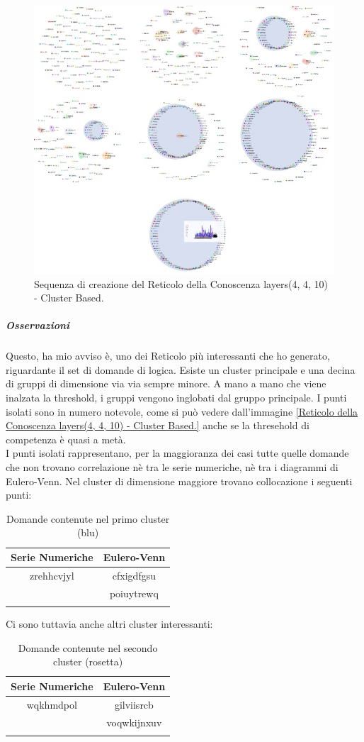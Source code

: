 \begin{figure}[H]
\centering
	\includegraphics[width=0.70\linewidth]{./image/collage_reticolo-logica(4,4,10).png}
	\caption{Sequenza di creazione del Reticolo della Conoscenza layers(4, 4, 10) - Cluster Based.}
	\label{Sequenza di creazione del Reticolo della Conoscenza layers(4, 4, 10) - Cluster Based.}
\end{figure}
\noindent

\subparagraph{Osservazioni}\mbox{}
\noindent
Questo, ha mio avviso \`e, uno dei Reticolo pi\`u interessanti che ho generato, riguardante il set di domande di logica.
Esiste un cluster principale e una decina di gruppi di dimensione via via sempre minore. A mano a mano che viene inalzata la threshold, i gruppi vengono inglobati dal gruppo principale. I punti isolati sono in numero notevole, come si pu\`o vedere dall'immagine \ref{Reticolo della Conoscenza layers(4, 4, 10) - Cluster Based.} anche se la thresehold di competenza \`e quasi a met\`a.\\
I punti isolati rappresentano, per la maggioranza dei casi tutte quelle domande che non trovano correlazione n\`e tra le serie numeriche, n\`e tra i diagrammi di Eulero-Venn. Nel cluster di dimensione maggiore trovano collocazione i seguenti punti:
\begin{longtable}{|c|c|}
	\hline
	\textbf{Serie Numeriche} & \textbf{Eulero-Venn} \\\hline\hline
	zrehhcvjyl & cfxigdfgsu \\
	           & poiuytrewq \\
	
\hline
\caption{Domande contenute nel primo cluster (blu)}\label{tab:Domande contenute nel primo cluster}
\end{longtable}
\noindent
Ci sono tuttavia anche altri cluster interessanti:
\begin{longtable}{|c|c|}
	\hline
	\textbf{Serie Numeriche} & \textbf{Eulero-Venn} \\\hline\hline
	wqkhmdpol & gilviisrcb \\
	           & voqwkijnxuv\\
	
\hline
\caption{Domande contenute nel secondo cluster (rosetta)}\label{tab:Domande contenute nel secondo cluster}
\end{longtable}
\noindent

